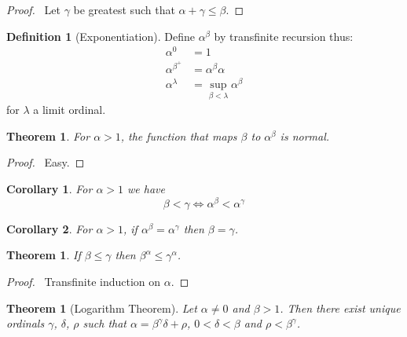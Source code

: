 \documentclass{report}
\let\qed\relax
\newtheorem{theorem}[axiom]{Theorem}
\newtheorem{corollary}{Corollary}[axiom]
\theoremstyle{definition}
\newtheorem{definition}[axiom]{Definition}
\begin{document}
    \begin{proof}
        \pf\ Let $\gamma$ be greatest such that $\alpha + \gamma \leq \beta$. \qed
    \end{proof}

    \begin{definition}[Exponentiation]
        Define $\alpha^\beta$ by transfinite recursion thus:
        \begin{align*}
            \alpha^0 & = 1 \\
            \alpha^{\beta^+} & = \alpha^\beta \alpha \\
            \alpha^\lambda & = \sup_{\beta < \lambda} \alpha^\beta
        \end{align*}
        for $\lambda$ a limit ordinal.
    \end{definition}

    \begin{theorem}
        For $\alpha > 1$, the function that maps $\beta$ to $\alpha^\beta$ is normal.
    \end{theorem}

    \begin{proof}
        \pf\ Easy. \qed
    \end{proof}

    \begin{corollary}
        For $\alpha > 1$ we have
        \[ \beta < \gamma \Leftrightarrow \alpha^\beta < \alpha^\gamma \]
    \end{corollary}
    
    \begin{corollary}
        For $\alpha > 1$, if $\alpha^\beta = \alpha^\gamma$ then $\beta = \gamma$.
    \end{corollary}

    \begin{theorem}
        If $\beta \leq \gamma$ then $\beta ^ \alpha \leq \gamma ^ \alpha$.
    \end{theorem}

    \begin{proof}
        \pf\ Transfinite induction on $\alpha$. \qed
    \end{proof}

    \begin{theorem}[Logarithm Theorem]
        Let $\alpha \neq 0$ and $\beta > 1$. Then there exist unique ordinals $\gamma$, $\delta$,
        $\rho$ such that $\alpha = \beta^\gamma \delta + \rho$, $0 < \delta < \beta$ and $\rho < \beta^\gamma$.
    \end{theorem}
\end{document}
